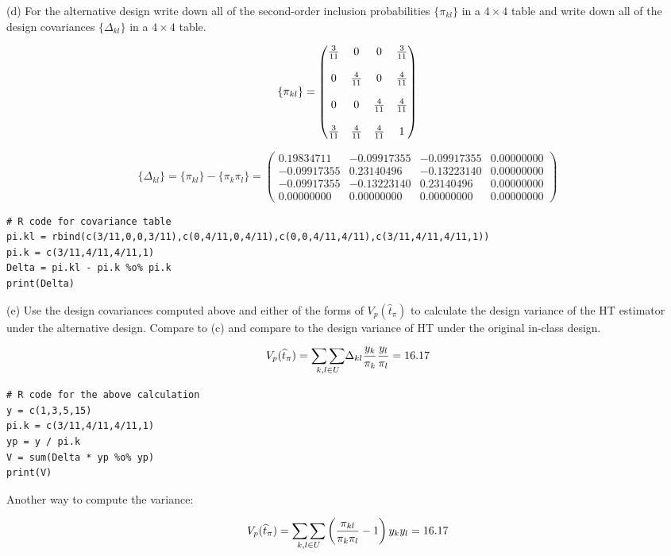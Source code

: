 \documentclass[12pt]{article}
\begin{document}
(d) For the alternative design write down all of the second-order
inclusion probabilities $\{\pi_{kl}\}$ in a $4\times4$ table
and write down all of the design covariances $\{\Delta_{kl}\}$
in a $4\times4$ table.

\[
\{\pi_{kl}\}=
\begin{pmatrix}
{3\over11} & 0 & 0 & {3\over11}\\ \\
0 & {4\over11} & 0 & {4\over11}\\ \\
0 & 0 & {4\over11} & {4\over11}\\ \\
{3\over11} & {4\over11} & {4\over11} & 1
\end{pmatrix}
\]

\[
\{\Delta_{kl}\}
=\{\pi_{kl}\}-\{\pi_k\pi_l\}=\left(\begin{array}{rrrr}
  0.19834711 &-0.09917355 &-0.09917355    &0.00000000\\
 -0.09917355  &0.23140496 &-0.13223140    &0.00000000\\
 -0.09917355 &-0.13223140  &0.23140496    &0.00000000\\
  0.00000000  &0.00000000  &0.00000000    &0.00000000
\end{array}\right)
\]

\begin{verbatim}
# R code for covariance table
pi.kl = rbind(c(3/11,0,0,3/11),c(0,4/11,0,4/11),c(0,0,4/11,4/11),c(3/11,4/11,4/11,1))
pi.k = c(3/11,4/11,4/11,1)
Delta = pi.kl - pi.k %o% pi.k
print(Delta)
\end{verbatim}


(e) Use the design covariances computed above and either of the forms
of $V_p(\widehat t_\pi)$ to calculate the design variance of the
HT estimator under the alternative design.
Compare to (c) and compare to the design variance of HT under
the original in-class design.

\[
V_p(\widehat t_\pi)=\underset{k, l\in U}{\sum\sum}
\Delta_{kl}{y_k\over\pi_k}{y_l\over\pi_l}=16.17
\]

\begin{verbatim}
# R code for the above calculation
y = c(1,3,5,15)
pi.k = c(3/11,4/11,4/11,1)
yp = y / pi.k
V = sum(Delta * yp %o% yp)
print(V)
\end{verbatim}

Another way to compute the variance:

\[
V_p(\widehat t_\pi)=\underset{k,l\in U}{\sum\sum}
\left({\pi_{kl}\over\pi_k\pi_l}-1\right)y_ky_l=16.17
\]
\end{document}
